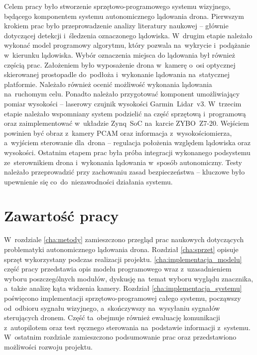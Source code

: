 Celem pracy było stworzenie sprzętowo-programowego systemu wizyjnego, będącego komponentem systemu autonomicznego lądowania drona. 
Pierwszym krokiem prac było przeprowadzenie analizy literatury naukowej -- głównie dotyczącej detekcji i~śledzenia oznaczonego lądowiska. 
W~drugim etapie należało wykonać model programowy algorytmu, który pozwala na~wykrycie i~podążanie w~kierunku  lądowiska. 
Wybór oznaczenia miejsca do lądowania był również częścią prac. 
Założeniem było wyposażenie drona w~kamerę o~osi optycznej skierowanej prostopadle do~podłoża i~wykonanie lądowania na~statycznej platformie. 
Należało również ocenić możliwość wykonania lądowania na~ruchomym celu.
Ponadto należało przygotować komponent umożliwiający pomiar wysokości -- laserowy czujnik wysokości Garmin~Lidar~v3. 
W~trzecim etapie należało wspomniany system podzielić na część sprzętową i~programową oraz zaimplementować w~układzie Zynq~SoC na~karcie ZYBO~Z7-20. 
Wejściem powinien być obraz z~kamery PCAM oraz informacja z~wysokościomierza, a~wyjściem sterowanie dla~drona -- regulacja położenia względem lądowiska oraz wysokości.
Ostatnim etapem prac była próba integracji wykonanego podsystemu ze~sterownikiem drona i~wykonania lądowania w~sposób autonomiczny. 
Testy należało przeprowadzić przy zachowaniu zasad bezpieczeństwa -- kluczowe było upewnienie się co~do~niezawodności działania systemu.



\section{Zawartość pracy}
\label{sec:zawartoscPracy}

W~rozdziale \ref{cha:metody} zamieszczono przegląd prac naukowych dotyczących problematyki autonomicznego lądowania drona. 
Rozdział \ref{cha:sprzet} opisuje sprzęt wykorzystany podczas realizacji projektu. 
\ref{cha:implementacja_modelu} część pracy przedstawia opis modelu programowego wraz z~uzasadnieniem wyboru poszczególnych modułów, dyskusję na~temat wyboru wyglądu znacznika, a~także analizę kąta widzenia kamery. 
Rozdział \ref{cha:implementacja_systemu} poświęcono implementacji sprzętowo-programowej całego systemu, począwszy od~odbioru sygnału wizyjnego, a~skończywszy na~wysyłaniu sygnałów sterujących dronem. Część ta~obejmuje również ewaluację komunikacji z~autopilotem oraz test ręcznego sterowania na~podstawie informacji z~systemu. 
W~ostatnim rozdziale zamieszczono podsumowanie prac oraz przedstawiono możliwości rozwoju projektu.

